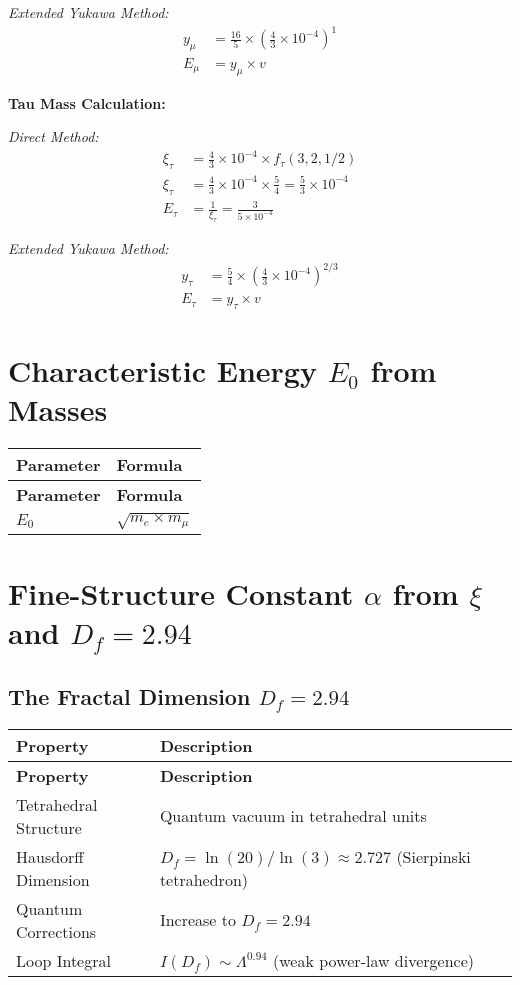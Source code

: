 \documentclass[12pt,a4paper]{article}
\begin{document}
	\textit{Extended Yukawa Method:}
	\begin{align}
		y_\mu &= \frac{16}{5} \times \left(\frac{4}{3} \times 10^{-4}\right)^1 \\
		E_\mu &= y_\mu \times v
	\end{align}
	
	\textbf{Tau Mass Calculation:}
	
	\textit{Direct Method:}
	\begin{align}
		\xi_\tau &= \frac{4}{3} \times 10^{-4} \times f_\tau(3,2,1/2) \\
		\xi_\tau &= \frac{4}{3} \times 10^{-4} \times \frac{5}{4} = \frac{5}{3} \times 10^{-4} \\
		E_{\tau} &= \frac{1}{\xi_\tau} = \frac{3}{5 \times 10^{-4}}
	\end{align}
	
	\textit{Extended Yukawa Method:}
	\begin{align}
		y_\tau &= \frac{5}{4} \times \left(\frac{4}{3} \times 10^{-4}\right)^{2/3} \\
		E_\tau &= y_\tau \times v
	\end{align}
	
	\section{Characteristic Energy \(E_0\) from Masses}
	
	\begin{longtable}{|p{3cm}|p{4cm}|}
		\hline
		\textbf{Parameter} & \textbf{Formula} \\
		\hline
		\endfirsthead
		\hline
		\textbf{Parameter} & \textbf{Formula} \\
		\hline
		\endhead
		\(E_0\) & \(\sqrt{m_e \times m_{\mu}}\) \\
		\hline
	\end{longtable}
	
	\section{Fine-Structure Constant \(\alpha\) from \(\xi\) and \(D_f = 2.94\)}
	
	\subsection{The Fractal Dimension \(D_f = 2.94\)}
	
	\begin{longtable}{|p{4cm}|p{6cm}|}
		\hline
		\textbf{Property} & \textbf{Description} \\
		\hline
		\endfirsthead
		\hline
		\textbf{Property} & \textbf{Description} \\
		\hline
		\endhead
		Tetrahedral Structure & Quantum vacuum in tetrahedral units \\
		\hline
		Hausdorff Dimension & \(D_f = \ln(20)/\ln(3) \approx 2.727\) (Sierpinski tetrahedron) \\
		\hline
		Quantum Corrections & Increase to \(D_f = 2.94\) \\
		\hline
		Loop Integral & \(I(D_f) \sim \Lambda^{0.94}\) (weak power-law divergence) \\
		\hline
	\end{longtable}
	
\end{document}
